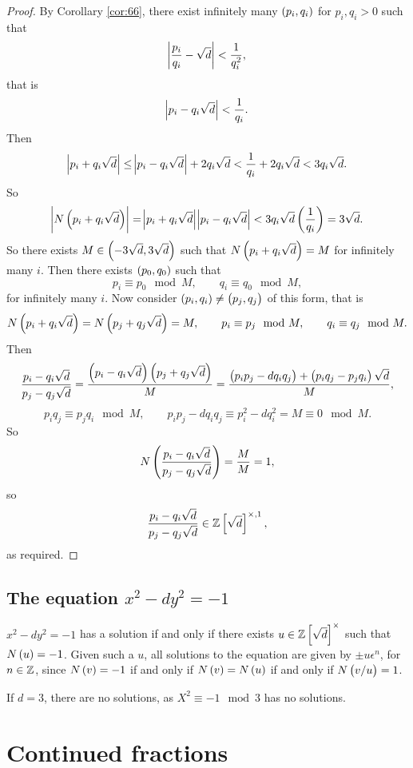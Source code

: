 \begin{proof}
By Corollary \ref{cor:66}, there exist infinitely many $ \br{p_i, q_i} $ for $ p_i, q_i > 0 $ such that
$$ \abs{\dfrac{p_i}{q_i} - \sqrt{d}} < \dfrac{1}{q_i^2}, $$
that is
$$ \abs{p_i - q_i\sqrt{d}} < \dfrac{1}{q_i}. $$
Then
$$ \abs{p_i + q_i\sqrt{d}} \le \abs{p_i - q_i\sqrt{d}} + 2q_i\sqrt{d} < \dfrac{1}{q_i} + 2q_i\sqrt{d} < 3q_i\sqrt{d}. $$
So
$$ \abs{N\br{p_i + q_i\sqrt{d}}} = \abs{p_i + q_i\sqrt{d}}\abs{p_i - q_i\sqrt{d}} < 3q_i\sqrt{d}\br{\dfrac{1}{q_i}} = 3\sqrt{d}. $$
So there exists $ M \in \br{-3\sqrt{d}, 3\sqrt{d}} $ such that $ N\br{p_i + q_i\sqrt{d}} = M $ for infinitely many $ i $. Then there exists $ \br{p_0, q_0} $ such that
$$ p_i \equiv p_0 \mod M, \qquad q_i \equiv q_0 \mod M, $$
for infinitely many $ i $. Now consider $ \br{p_i, q_i} \ne \br{p_j, q_j} $ of this form, that is
$$ N\br{p_i + q_i\sqrt{d}} = N\br{p_j + q_j\sqrt{d}} = M, \qquad p_i \equiv p_j \mod M, \qquad q_i \equiv q_j \mod M. $$
Then
$$ \dfrac{p_i - q_i\sqrt{d}}{p_j - q_j\sqrt{d}} = \dfrac{\br{p_i - q_i\sqrt{d}}\br{p_j + q_j\sqrt{d}}}{M} = \dfrac{\br{p_ip_j - dq_iq_j} + \br{p_iq_j - p_jq_i}\sqrt{d}}{M}, $$
$$ p_iq_j \equiv p_jq_i \mod M, \qquad p_ip_j - dq_iq_j \equiv p_i^2 - dq_i^2 = M \equiv 0 \mod M. $$
So
$$ N\br{\dfrac{p_i - q_i\sqrt{d}}{p_j - q_j\sqrt{d}}} = \dfrac{M}{M} = 1, $$
so
$$ \dfrac{p_i - q_i\sqrt{d}}{p_j - q_j\sqrt{d}} \in \Z\sbr{\sqrt{d}}^{\times, 1}, $$
as required.
\end{proof}


\subsection{The equation \texorpdfstring{$ x^2 - dy^2 = - 1 $}{x2 - dy2 = -1}}

$ x^2 - dy^2 = -1 $ has a solution if and only if there exists $ u \in \Z\sbr{\sqrt{d}}^\times $ such that $ N\br{u} = -1 $. Given such a $ u $, all solutions to the equation are given by $ \pm u\epsilon^n $, for $ n \in \mathbb{Z} $, since $ N\br{v} = -1 $ if and only if $ N\br{v} = N\br{u} $ if and only if $ N\br{v / u} = 1 $.

\begin{example*}
If $ d = 3 $, there are no solutions, as $ X^2 \equiv -1 \mod 3 $ has no solutions.
\end{example*}

\pagebreak

\section{Continued fractions}

